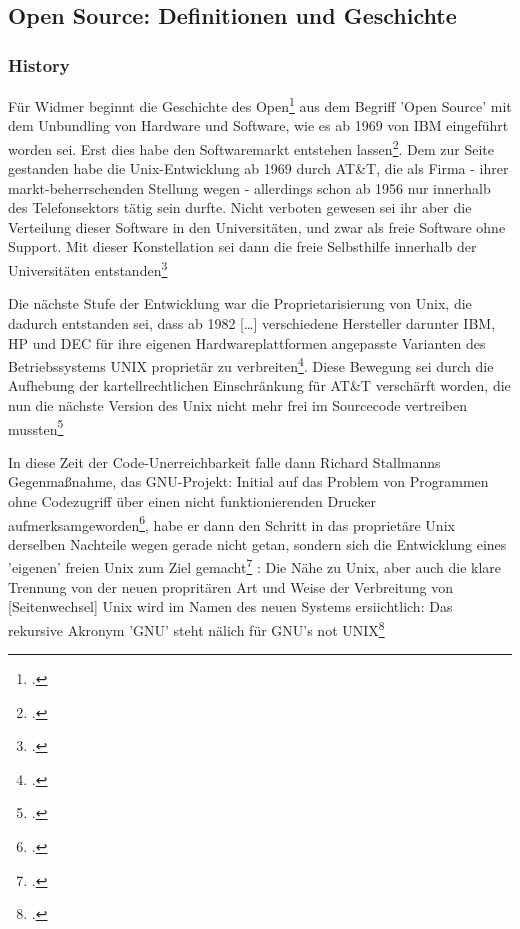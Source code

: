 \documentclass[DIV=calc,BCOR=5mm,11pt,headings=small,oneside,abstract=true, toc=bib]{scrartcl}
\begin{document}
\subsection{Open Source: Definitionen und Geschichte}

\subsubsection{History}

Für Widmer beginnt die Geschichte des
\glqq{}Open\grqq{}\footcite[vgl.][8]{Widmer2003a} aus dem Begriff 'Open Source'
mit dem \glqq{}Unbundling\grqq{} von Hardware und Software, wie es ab 1969 von
IBM eingeführt worden sei. Erst dies habe den Softwaremarkt entstehen
lassen\footcite[vgl.][9]{Widmer2003a}. Dem zur Seite gestanden habe die
Unix-Entwicklung ab 1969 durch AT\&T, die als Firma - ihrer markt-beherrschenden
Stellung wegen - allerdings schon ab 1956 nur innerhalb des Telefonsektors tätig
sein durfte. Nicht verboten gewesen sei ihr aber die Verteilung dieser Software
in den Universitäten, und zwar als freie Software ohne Support. Mit dieser
Konstellation sei dann die freie Selbsthilfe innerhalb der Universitäten
entstanden\footcite[vgl.][10f jener Arbeitsstil, wie von außen zu ergänzen wäre
- in den Stallmann hineingekommen und den er so konstitutiv zu schätzen gelernt
hatte.]{Widmer2003a}

Die nächste Stufe der Entwicklung war die Proprietarisierung von Unix, die
dadurch entstanden sei, dass ab \glqq{} 1982 [\ldots] verschiedene
Hersteller darunter IBM, HP und DEC für ihre eigenen Hardwareplattformen
angepasste Varianten des Betriebssystems UNIX proprietär zu
verbreiten\grqq{}\footcite[vgl.][12 original zitiert nach Müller:
Die Wurzeln freier Software]{Widmer2003a}. Diese Bewegung sei durch die
Aufhebung der kartellrechtlichen Einschränkung für AT\&T verschärft worden, die
nun die nächste Version des Unix nicht mehr frei im Sourcecode vertreiben
mussten\footcite[vgl.][12]{Widmer2003a}

In diese Zeit der Code-Unerreichbarkeit falle dann Richard Stallmanns
Gegenmaßnahme, das GNU-Projekt: Initial auf das Problem von  Programmen ohne
Codezugriff über einen nicht funktionierenden Drucker
aufmerksamgeworden\footcite[vgl.][13]{Widmer2003a}, habe er dann den Schritt in
das proprietäre Unix derselben Nachteile wegen gerade nicht getan, sondern sich
die Entwicklung eines 'eigenen' freien Unix zum Ziel
gemacht\footcite[vgl.][13]{Widmer2003a} : \glqq{}Die Nähe zu Unix, aber auch die
klare Trennung von der neuen propritären Art und Weise der Verbreitung von
[Seitenwechsel] Unix wird im Namen des neuen Systems ersiichtlich: Das rekursive
Akronym 'GNU' steht nälich für GNU's not
UNIX\grqq{}\footcite[][13f]{Widmer2003a}
\end{document}
